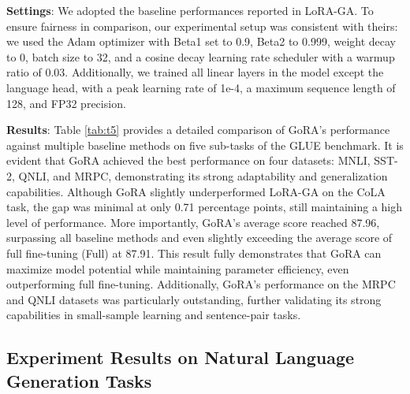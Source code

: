 \textbf{Settings}: We adopted the baseline performances reported in LoRA-GA\citep{wang2024lora-ga}. To ensure fairness in comparison, our experimental setup was consistent with theirs: we used the Adam\citep{kingma2014adam} optimizer with Beta1 set to 0.9, Beta2 to 0.999, weight decay to 0, batch size to 32, and a cosine decay learning rate scheduler with a warmup ratio of 0.03. Additionally, we trained all linear layers in the model except the language head, with a peak learning rate of 1e-4, a maximum sequence length of 128, and FP32 precision. 

\textbf{Results}: Table \ref{tab:t5} provides a detailed comparison of GoRA's performance against multiple baseline methods on five sub-tasks of the GLUE benchmark. It is evident that GoRA achieved the best performance on four datasets: MNLI, SST-2, QNLI, and MRPC, demonstrating its strong adaptability and generalization capabilities. Although GoRA slightly underperformed LoRA-GA on the CoLA task, the gap was minimal at only 0.71 percentage points, still maintaining a high level of performance. More importantly, GoRA's average score reached 87.96, surpassing all baseline methods and even slightly exceeding the average score of full fine-tuning (Full) at 87.91. This result fully demonstrates that GoRA can maximize model potential while maintaining parameter efficiency, even outperforming full fine-tuning. Additionally, GoRA's performance on the MRPC and QNLI datasets was particularly outstanding, further validating its strong capabilities in small-sample learning and sentence-pair tasks.

\subsection{Experiment Results on Natural Language Generation Tasks}
\label{llama exp}


